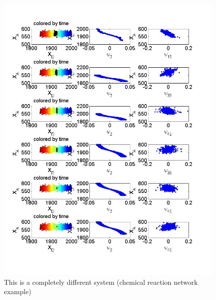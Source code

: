 \documentclass[12pt]{article}
\begin{document}
\begin{figure}
\includegraphics[width=\textwidth]{vary_window_sizes_sde2}
\caption{This is a completely different system (chemical reaction network example)}
\label{fig:1d1drxnnetwork}
\end{figure}
\end{document}
